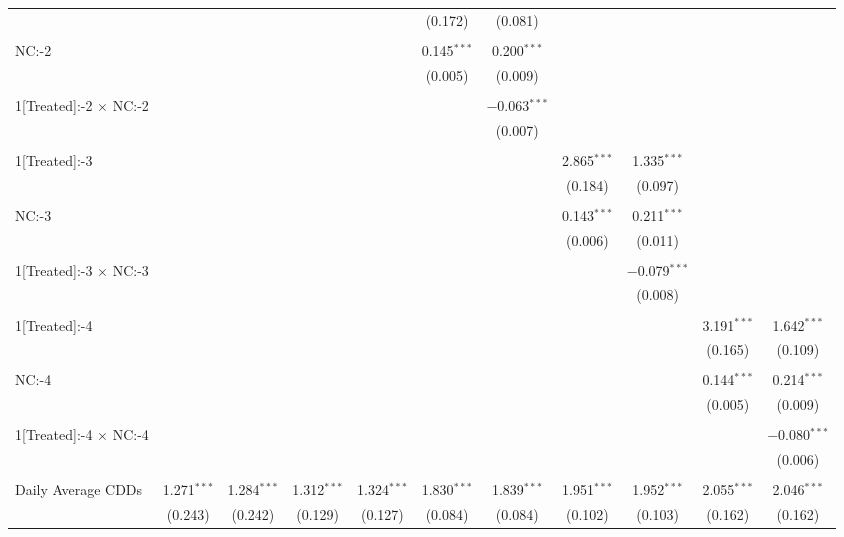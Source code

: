 \begin{table}[!htbp]
\begin{tabular}{@{\extracolsep{5pt}}lcccccccccc}
  &  &  &  &  & (0.172) & (0.081) &  &  &  &  \\ 
  & & & & & & & & & & \\ 
 NC:-2 &  &  &  &  & 0.145$^{***}$ & 0.200$^{***}$ &  &  &  &  \\ 
  &  &  &  &  & (0.005) & (0.009) &  &  &  &  \\ 
  & & & & & & & & & & \\ 
 1[Treated]:-2 $\times$ NC:-2 &  &  &  &  &  & $-$0.063$^{***}$ &  &  &  &  \\ 
  &  &  &  &  &  & (0.007) &  &  &  &  \\ 
  & & & & & & & & & & \\ 
 1[Treated]:-3 &  &  &  &  &  &  & 2.865$^{***}$ & 1.335$^{***}$ &  &  \\ 
  &  &  &  &  &  &  & (0.184) & (0.097) &  &  \\ 
  & & & & & & & & & & \\ 
 NC:-3 &  &  &  &  &  &  & 0.143$^{***}$ & 0.211$^{***}$ &  &  \\ 
  &  &  &  &  &  &  & (0.006) & (0.011) &  &  \\ 
  & & & & & & & & & & \\ 
 1[Treated]:-3 $\times$ NC:-3 &  &  &  &  &  &  &  & $-$0.079$^{***}$ &  &  \\ 
  &  &  &  &  &  &  &  & (0.008) &  &  \\ 
  & & & & & & & & & & \\ 
 1[Treated]:-4 &  &  &  &  &  &  &  &  & 3.191$^{***}$ & 1.642$^{***}$ \\ 
  &  &  &  &  &  &  &  &  & (0.165) & (0.109) \\ 
  & & & & & & & & & & \\ 
 NC:-4 &  &  &  &  &  &  &  &  & 0.144$^{***}$ & 0.214$^{***}$ \\ 
  &  &  &  &  &  &  &  &  & (0.005) & (0.009) \\ 
  & & & & & & & & & & \\ 
 1[Treated]:-4 $\times$ NC:-4 &  &  &  &  &  &  &  &  &  & $-$0.080$^{***}$ \\ 
  &  &  &  &  &  &  &  &  &  & (0.006) \\ 
  & & & & & & & & & & \\ 
 Daily Average CDDs & 1.271$^{***}$ & 1.284$^{***}$ & 1.312$^{***}$ & 1.324$^{***}$ & 1.830$^{***}$ & 1.839$^{***}$ & 1.951$^{***}$ & 1.952$^{***}$ & 2.055$^{***}$ & 2.046$^{***}$ \\ 
  & (0.243) & (0.242) & (0.129) & (0.127) & (0.084) & (0.084) & (0.102) & (0.103) & (0.162) & (0.162) \\ 

\end{tabular}
\end{table}
